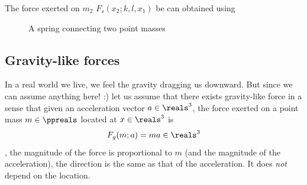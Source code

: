\documentclass{article}
\begin{document}
The force exerted on $m_2$ $F_s(x_2;k,l,x_1)$ be can obtained using

\begin{figure}
\begin{center}
\end{center}
\caption{A spring connecting two point masses}
\label{fig:spring}
\end{figure}

\subsection{Gravity-like forces}

In a real world we live, we feel the gravity dragging us downward.
But since we can assume anything here! :)
let us assume that there exists gravity-like force
in a sense that given an acceleration vector $a\in\reals^3$,
the force exerted on a point mass $m\in\ppreals$ located at $x\in\reals^3$
is
\begin{equation}
\label{eq:force:gravity-like}
F_g(m;a) = ma
	\in\reals^3
\end{equation}
\ie,
the magnitude of the force is proportional to $m$ (and the magnitude of the acceleration),
the direction is the same as that of the acceleration.
It does \emph{not} depend on the location.
\end{document}
